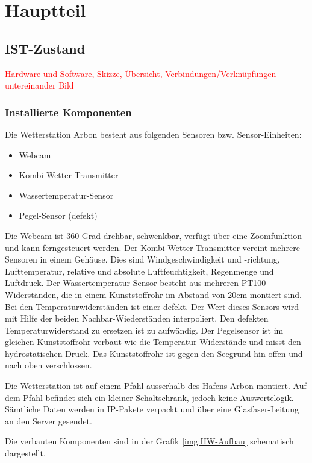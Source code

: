 \documentclass[a4paper,ngerman, 11pt]{report}
\newcommand\Diskussionspunkt[1]{\textcolor{red}{#1}}
\begin{document}
\chapter{Hauptteil}

\section{IST-Zustand}
\Diskussionspunkt{Hardware und Software, 
Skizze, 
Übersicht, 
Verbindungen/Verknüpfungen untereinander}
\Diskussionspunkt{Bild}

\subsection{Installierte Komponenten}

Die Wetterstation Arbon besteht aus folgenden Sensoren bzw. Sensor-Einheiten:
\begin{itemize}  
\item Webcam
\item Kombi-Wetter-Transmitter
\item Wassertemperatur-Sensor
\item Pegel-Sensor (defekt)
\end{itemize}


Die Webcam ist 360 Grad drehbar, schwenkbar, verfügt über eine Zoomfunktion und kann ferngesteuert werden.  Der Kombi-Wetter-Transmitter vereint mehrere Sensoren in einem Gehäuse. Dies sind Windgeschwindigkeit und -richtung, Lufttemperatur, relative und absolute Luftfeuchtigkeit, Regenmenge und Luftdruck. Der Wassertemperatur-Sensor besteht aus mehreren PT100-Widerständen, die in einem Kunststoffrohr im Abstand von 20cm montiert sind. Bei den Temperaturwiderständen ist einer defekt. Der Wert dieses Sensors wird mit Hilfe der beiden Nachbar-Wiederständen interpoliert. Den defekten Temperaturwiderstand zu ersetzen ist zu aufwändig. Der Pegelsensor ist im gleichen Kunststoffrohr verbaut wie die Temperatur-Widerstände und misst den hydrostatischen Druck. Das Kunststoffrohr ist gegen den Seegrund hin offen und nach oben verschlossen.

Die Wetterstation ist auf einem Pfahl ausserhalb des Hafens Arbon montiert. Auf dem Pfahl befindet sich ein kleiner Schaltschrank, jedoch keine Auswertelogik. Sämtliche Daten werden in IP-Pakete verpackt und über eine Glasfaser-Leitung an den Server gesendet.

Die verbauten Komponenten sind in der Grafik \ref{img:HW-Aufbau} schematisch dargestellt.
\end{document}
